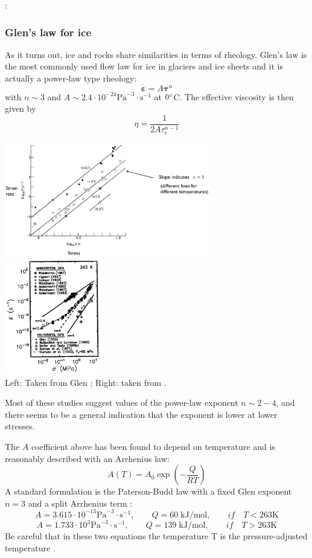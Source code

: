 \Literature: \cite{king16}

\subsubsection{Glen's law for ice}\label{ss:glen}

As it turns out, ice and rocks share similarities in terms of rheology.
Glen's law is the most commonly used flow law for ice in glaciers and ice sheets \cite{glen55}
and it is actually a power-law type rheology:
\[
\dot{\bm \varepsilon} = A {\bm \tau}^n 
\]
with $n\sim 3$ and $A\sim 2.4\cdot 10^{-24} \text{Pa}^{-3}\cdot \text{s}^{-1}$ at $0\degree$C.
The effective viscosity is then given by
\[
\eta = \frac{1}{2 A \tau_e^{n-1}} 
\]
\begin{center}
\includegraphics[height=5cm]{images/rheology/glen}
\includegraphics[height=5cm]{images/rheology/goko01}\\
{\captionfont Left: Taken from Glen \cite{glen55}; Right: taken from \cite{goko01}.}
\end{center}
Most of these studies suggest values of the power-law exponent $n\sim 2-4$, and there seems to be 
a general indication that the exponent is lower at lower stresses.

The $A$ coefficient above has been found to depend on temperature and is reasonably described 
with an Arrhenius law:
\[
A(T)=A_0 \exp\left( -\frac{Q}{RT} \right)
\]
A standard formulation is the Paterson-Budd law with a fixed Glen exponent $n=3$ and 
a split Arrhenius term \cite{pabu82}:
\[
A=3.615 \cdot 10^{-13} \text{Pa}^{-3}\cdot \text{s}^{-1}, \qquad Q=60 \; \text{kJ}/\text{mol}, \qquad if\quad T<263\text{K} 
\]
\[
A=1.733\cdot 10^{3} \text{Pa}^{-3}\cdot \text{s}^{-1}, \qquad  Q=139 \; \text{kJ}/\text{mol}, \qquad if\quad T>263\text{K}
\]
Be careful that in these two equations the temperature T is the pressure-adjusted temperature \cite{pabu82}.


